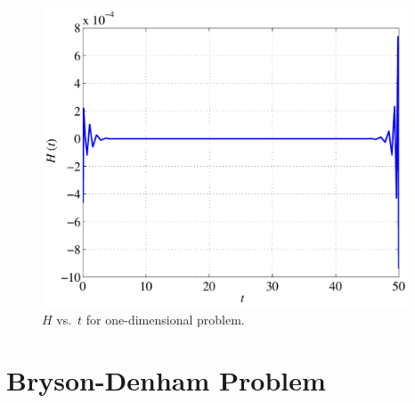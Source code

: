 \documentclass[10pt,final]{report}
\begin{document}
\begin{figure}[H]
  \centering
  \includegraphics[height=3.5in]{Hamvst_hyper.pdf}
  \caption{$H$ vs.~$t$ for one-dimensional problem.}
\end{figure}

\section{Bryson-Denham Problem}
\end{document}
